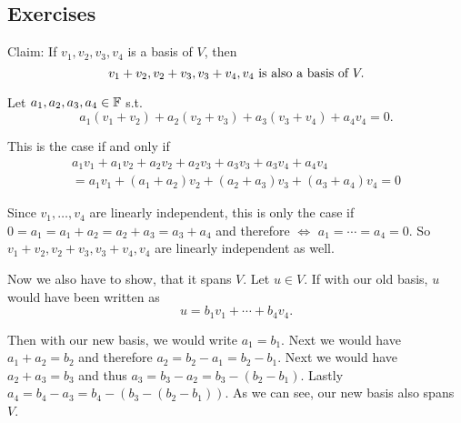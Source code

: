 \subsection{Exercises}
\setcounter{xrcs}{5}
\begin{xrcs}
   Claim: If $v_1, v_2, v_3, v_4$ is a basis of $V$, then
  \begin{equation}
    v_1 + v_2, v_2 + v_3, v_3+v_4, v_4 $ is also a basis of $V.
  \end{equation}


  \begin{prf}
    Let $a_1, a_2, a_3, a_4 \in \mathbb{F}$ s.t.
    \begin{equation*}
      a_1 (v_1+v_2) + a_2(v_2+v_3) + a_3(v_3+v_4)+a_4 v_4 = 0.
    \end{equation*}

    This is the case if and only if
    \begin{multline*}
      a_1 v_1 + a_1 v_2 + a_2 v_2 + a_2 v_3 + a_3 v_3 + a_3 v_4 + a_4 v_4 \\
      = a_1 v_1 + (a_1 + a_2) v_2 + (a_2 + a_3) v_3 + (a_3 + a_4)v_4=0
    \end{multline*}

    Since $v_1, \ldots, v_4$ are linearly independent, this is only the case if $0 = a_1 = a_1 + a_2 = a_2 + a_3 = a_3 + a_4$ and therefore $\iff$ $a_1 = \cdots = a_4 = 0$. So $v_1 + v_2, v_2 + v_3, v_3+v_4, v_4$ are linearly independent as well.

    Now we also have to show, that it spans $V$. Let $u \in V$. If with our old basis, $u$ would have been written as
    \begin{equation*}
      u = b_1 v_1 + \cdots + b_4 v_4.
    \end{equation*}

    Then with our new basis, we would write $a_1 = b_1.$ Next we would have $a_1 + a_2 = b_2$ and therefore $a_2 = b_2 - a_1 = b_2-b_1$. Next we would have $a_2+a_3=b_3$ and thus $a_3= b_3-a_2 = b_3 - (b_2-b_1)$. Lastly $a_4 = b_4-a_3 = b_4-(b_3 - (b_2-b_1))$. As we can see, our new basis also spans $V$.
  \end{prf}
\end{xrcs}

